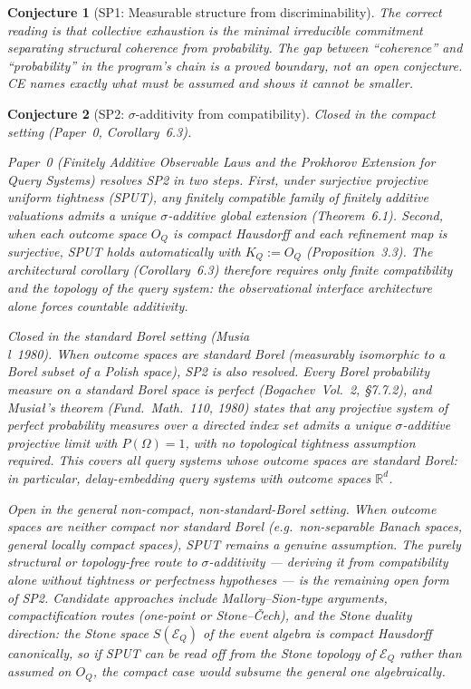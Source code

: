 \documentclass[11pt]{article}
\newtheorem{conjecture}{Conjecture}
\begin{document}
\begin{conjecture}[SP1: Measurable structure from discriminability]
The correct reading is that collective exhaustion is the \emph{minimal irreducible
commitment} separating structural coherence from probability.  The gap between
``coherence'' and ``probability'' in the program's chain is a proved boundary,
not an open conjecture.  CE names exactly what must be assumed and shows it cannot
be smaller.
\end{conjecture}

\begin{conjecture}[SP2: $\sigma$-additivity from compatibility]
\emph{Closed in the compact setting (Paper~0, Corollary~6.3).}

Paper~0 (\emph{Finitely Additive Observable Laws and the Prokhorov
Extension for Query Systems}) resolves SP2 in two steps.  First,
under surjective projective uniform tightness (SPUT), any finitely
compatible family of finitely additive valuations admits a unique
$\sigma$-additive global extension (Theorem~6.1).  Second, when each
outcome space $O_Q$ is compact Hausdorff and each refinement map is
surjective, SPUT holds automatically with $K_Q := O_Q$
(Proposition~3.3).  The architectural corollary (Corollary~6.3)
therefore requires only finite compatibility and the topology of the
query system: \emph{the observational interface architecture alone
forces countable additivity.}

\emph{Closed in the standard Borel setting (Musia{\\l}~1980).}
When outcome spaces are standard Borel (measurably isomorphic to a
Borel subset of a Polish space), SP2 is also resolved.  Every Borel
probability measure on a standard Borel space is perfect
(Bogachev~Vol.~2, \S7.7.2), and Musia\l's theorem
(Fund.\ Math.\ 110, 1980) states that any projective system of
perfect probability measures over a directed index set admits a
unique $\sigma$-additive projective limit with $P(\Omega)=1$, with
no topological tightness assumption required.  This covers all
query systems whose outcome spaces are standard Borel: in particular,
delay-embedding query systems with outcome spaces $\mathbb{R}^d$.

\emph{Open in the general non-compact, non-standard-Borel setting.}
When outcome spaces are neither compact nor standard Borel (e.g.\
non-separable Banach spaces, general locally compact spaces), SPUT
remains a genuine assumption.  The purely structural or topology-free
route to $\sigma$-additivity --- deriving it from compatibility alone
without tightness or perfectness hypotheses --- is the remaining open
form of SP2.  Candidate approaches include Mallory--Sion-type
arguments, compactification routes (one-point or Stone--\v{C}ech),
and the Stone duality direction: the Stone space $S(\mathcal{E}_Q)$
of the event algebra is compact Hausdorff canonically, so if SPUT
can be read off from the Stone topology of $\mathcal{E}_Q$ rather
than assumed on $O_Q$, the compact case would subsume the general one
algebraically.
\end{conjecture}
\end{document}
